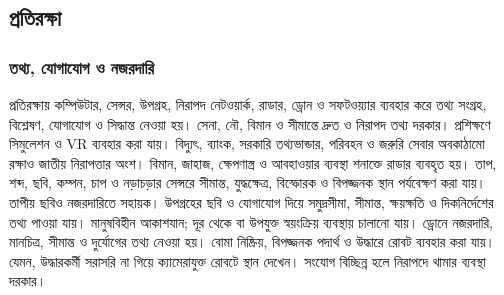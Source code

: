 \subsection{প্রতিরক্ষা}
\label{sec:ch1-defence}
\subsubsection{তথ্য, যোগাযোগ ও নজরদারি}
প্রতিরক্ষায় কম্পিউটার, সেন্সর, উপগ্রহ, নিরাপদ নেটওয়ার্ক, রাডার, ড্রোন ও সফটওয়্যার ব্যবহার করে তথ্য সংগ্রহ, বিশ্লেষণ, যোগাযোগ ও সিদ্ধান্ত নেওয়া হয়। সেনা, নৌ, বিমান ও সীমান্তে দ্রুত ও নিরাপদ তথ্য দরকার। প্রশিক্ষণে সিমুলেশন ও VR ব্যবহার করা যায়। বিদ্যুৎ, ব্যাংক, সরকারি তথ্যভান্ডার, পরিবহন ও জরুরি সেবার অবকাঠামো রক্ষাও জাতীয় নিরাপত্তার অংশ।
বিমান, জাহাজ, ক্ষেপণাস্ত্র ও আবহাওয়ার ব্যবস্থা শনাক্তে রাডার ব্যবহৃত হয়। তাপ, শব্দ, ছবি, কম্পন, চাপ ও নড়াচড়ার সেন্সরে সীমান্ত, যুদ্ধক্ষেত্র, বিস্ফোরক ও বিপজ্জনক স্থান পর্যবেক্ষণ করা যায়। তাপীয় ছবিও নজরদারিতে সহায়ক। উপগ্রহের ছবি ও যোগাযোগ দিয়ে সমুদ্রসীমা, সীমান্ত, ক্ষয়ক্ষতি ও দিকনির্দেশের তথ্য পাওয়া যায়।
 মানুষবিহীন আকাশযান; দূর থেকে বা উপযুক্ত স্বয়ংক্রিয় ব্যবস্থায় চালানো যায়। ড্রোনে নজরদারি, মানচিত্র, সীমান্ত ও দুর্যোগের তথ্য নেওয়া হয়। বোমা নিষ্ক্রিয়, বিপজ্জনক পদার্থ ও উদ্ধারে রোবট ব্যবহার করা যায়। যেমন, উদ্ধারকর্মী সরাসরি না গিয়ে ক্যামেরাযুক্ত রোবটে স্থান দেখেন। সংযোগ বিচ্ছিন্ন হলে নিরাপদে থামার ব্যবস্থা দরকার।
